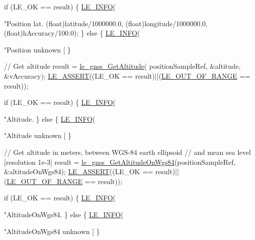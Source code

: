 \begin{DoxyCodeInclude}
{{{{{{{{{{    \textcolor{keywordflow}{if} (LE\_OK == result)
    \{
        \hyperlink{le__log_8h_a23e6d206faa64f612045d688cdde5808}{LE\_INFO}(\textcolor{stringliteral}{"Position lat.%
                (\textcolor{keywordtype}{float})latitude/1000000.0,
                (\textcolor{keywordtype}{float})longitude/1000000.0,
                (\textcolor{keywordtype}{float})hAccuracy/100.0);
    \}
    \textcolor{keywordflow}{else}
    \{
        \hyperlink{le__log_8h_a23e6d206faa64f612045d688cdde5808}{LE\_INFO}(\textcolor{stringliteral}{"Position unknown [%
    \}

    \textcolor{comment}{// Get altitude}
    result = \hyperlink{le__gnss__interface_8h_a5cc278268a4e75c5e2a5f8c1ffb64fa9}{le\_gnss\_GetAltitude}( positionSampleRef, &altitude, &vAccuracy);
    \hyperlink{le__log_8h_ac0dbbef91dc0fed449d0092ff0557b39}{LE\_ASSERT}((LE\_OK == result)||(\hyperlink{le__basics_8h_a1cca095ed6ebab24b57a636382a6c86caef8ecf11fa8556fd2d3ca8faab697717}{LE\_OUT\_OF\_RANGE} == result));

    \textcolor{keywordflow}{if} (LE\_OK == result)
    \{
        \hyperlink{le__log_8h_a23e6d206faa64f612045d688cdde5808}{LE\_INFO}(\textcolor{stringliteral}{"Altitude.%
    \}
    \textcolor{keywordflow}{else}
    \{
        \hyperlink{le__log_8h_a23e6d206faa64f612045d688cdde5808}{LE\_INFO}(\textcolor{stringliteral}{"Altitude unknown [%
    \}

    \textcolor{comment}{// Get altitude in meters, between WGS-84 earth ellipsoid}
    \textcolor{comment}{// and mean sea level [resolution 1e-3]}
    result = \hyperlink{le__gnss__interface_8h_a59727ef079dc93dfadef75dd6a021cd0}{le\_gnss\_GetAltitudeOnWgs84}(positionSampleRef, &altitudeOnWgs84);
    \hyperlink{le__log_8h_ac0dbbef91dc0fed449d0092ff0557b39}{LE\_ASSERT}((LE\_OK == result)||(\hyperlink{le__basics_8h_a1cca095ed6ebab24b57a636382a6c86caef8ecf11fa8556fd2d3ca8faab697717}{LE\_OUT\_OF\_RANGE} == result));

    \textcolor{keywordflow}{if} (LE\_OK == result)
    \{
        \hyperlink{le__log_8h_a23e6d206faa64f612045d688cdde5808}{LE\_INFO}(\textcolor{stringliteral}{"AltitudeOnWgs84.%
    \}
    \textcolor{keywordflow}{else}
    \{
        \hyperlink{le__log_8h_a23e6d206faa64f612045d688cdde5808}{LE\_INFO}(\textcolor{stringliteral}{"AltitudeOnWgs84 unknown [%
    \}

}}}}}}}}}}}}}}}}
\end{DoxyCodeInclude}
